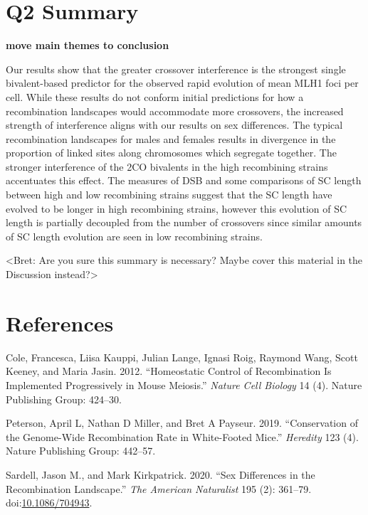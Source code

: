 \documentclass[]{article}
\begin{document}
\section{Q2 Summary}\label{q2-summary}

\textbf{move main themes to conclusion}

Our results show that the greater crossover interference is the
strongest single bivalent-based predictor for the observed rapid
evolution of mean MLH1 foci per cell. While these results do not conform
initial predictions for how a recombination landscapes would accommodate
more crossovers, the increased strength of interference aligns with our
results on sex differences. The typical recombination landscapes for
males and females results in divergence in the proportion of linked
sites along chromosomes which segregate together. The stronger
interference of the 2CO bivalents in the high recombining strains
accentuates this effect. The measures of DSB and some comparisons of SC
length between high and low recombining strains suggest that the SC
length have evolved to be longer in high recombining strains, however
this evolution of SC length is partially decoupled from the number of
crossovers since similar amounts of SC length evolution are seen in low
recombining strains.

\textless{}Bret: Are you sure this summary is necessary? Maybe cover
this material in the Discussion instead?\textgreater{}

\section*{References}\label{references}

\hypertarget{refs}{}
\hypertarget{ref-cole2012}{}
Cole, Francesca, Liisa Kauppi, Julian Lange, Ignasi Roig, Raymond Wang,
Scott Keeney, and Maria Jasin. 2012. ``Homeostatic Control of
Recombination Is Implemented Progressively in Mouse Meiosis.''
\emph{Nature Cell Biology} 14 (4). Nature Publishing Group: 424--30.

\hypertarget{ref-peterson2019}{}
Peterson, April L, Nathan D Miller, and Bret A Payseur. 2019.
``Conservation of the Genome-Wide Recombination Rate in White-Footed
Mice.'' \emph{Heredity} 123 (4). Nature Publishing Group: 442--57.

\hypertarget{ref-sardell_sex_2020}{}
Sardell, Jason M., and Mark Kirkpatrick. 2020. ``Sex Differences in the
Recombination Landscape.'' \emph{The American Naturalist} 195 (2):
361--79. doi:\href{https://doi.org/10.1086/704943}{10.1086/704943}.
\end{document}
